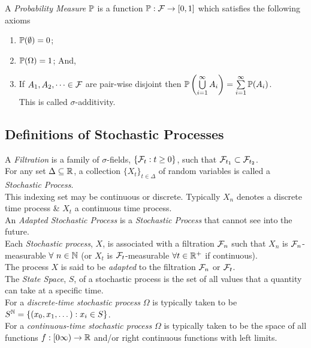 \documentclass[11pt,a4paper]{article}
\begin{document}
A \textit{Probability Measure} $\mathbb{P}$ is a function $\mathbb{P}:\mathcal{F}\to[0,1]$ which satisfies the following axioms
\begin{enumerate}[label=\roman*)]
	\item $\mathbb{P}(\emptyset)=0$;
	\item $\mathbb{P}(\Omega)=1$; And,
	\item If $A_1,A_2,\dots\in\mathcal{F}$ are pair-wise disjoint then $\mathbb{P}\left(\bigcup\limits_{i=1}^\infty A_i\right)=\sum\limits_{i=1}^\infty\mathbb{P}(A_i)$.\\
	This is called $\sigma$-additivity.
\end{enumerate}

\subsection{Definitions of Stochastic Processes}

A \textit{Filtration} is a family of $\sigma$-fields, $\{\mathcal{F}_t:t\geq0\}$, such that $\mathcal{F}_{t_1}\subset\mathcal{F}_{t_2}$.\\

For any set $\Delta\subseteq\mathbb{R}$, a collection $\{X_t\}_{t\in\Delta} $ of random variables is called a \textit{Stochastic Process}.\\
\nb This indexing set may be continuous or discrete. Typically $X_n$ denotes a discrete time process \& $X_t$ a continuous time process.\\

An \textit{Adapted Stochastic Process} is a \textit{Stochastic Process} that cannot see into the future.\\
Each \textit{Stochastic process}, $X$, is associated with a filtration $\mathcal{F}_n$ such that $X_n$ is $\mathcal{F}_n$-measurable $\forall\ n\in\mathbb{N}$ (or $X_t$ is $\mathcal{F}_t$-measurable $\forall t\in\mathbb{R}^+$ if continuous).\\
The process $X$ is said to be \textit{adapted} to the filtration $\mathcal{F}_n$ or $\mathcal{F}_t$.\\

The \textit{State Space}, $S$, of a stochastic process is the set of all values that a quantity can take at a specific time.\\

For a \textit{discrete-time stochastic process} $\Omega$ is typically taken to be $S^{\mathbb{N}}=\{(x_0,x_1,\dots):x_i\in S\}$.\\
For a \textit{continuous-time stochastic process} $\Omega$ is typically taken to be the space of all functions $f:[0\infty)\to\mathbb{R}$ and/or right continuous functions with left limits.\\
\end{document}
